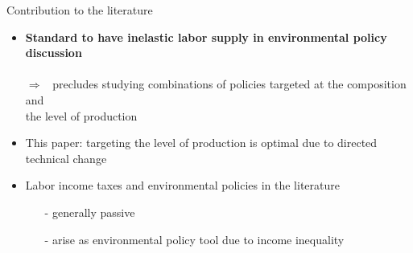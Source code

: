 \documentclass[11pt,aspectratio=169]{beamer}
\newcommand{\ar}{$\Rightarrow$ \ }
\begin{document}
\begin{frame}{Contribution to the literature}
	\begin{itemize}[<+->]
		\item \alert{\textbf{Standard to have inelastic labor supply in environmental policy discussion}}\\  \footnotesize{ \citep{Acemoglu2012TheChange, Golosov2014OptimalEquilibrium, Acemoglu2016TransitionTechnology, Fried2018ClimateAnalysis, Hart2019TheEconomists}}
		\\  \normalsize{\alert{\ar precludes studying combinations of policies targeted at the composition and\\ \hspace{5mm} the level of production }}
		\vspace{2mm}
		\item \alert{This paper}: targeting the level of production is optimal due to  directed technical change %
		\vspace{2mm}
		\item \alert{Labor income taxes and environmental policies in the literature}
		\begin{itemize}
			\item[-]  generally passive \footnotesize{ \citep{ LansBovenberg1994EnvironmentalTaxation, Goulder1995EnvironmentalGuide, Barrage2019OptimalPolicy}} %
			\item[-] arise as environmental policy tool due to {income inequality} \footnotesize{\citep{Jacobs2019RedistributionCurves, Dobkowitz2022, Douenne2022OptimalHouseholds}}
		\end{itemize}

\end{itemize}
\end{frame}
\end{document}
